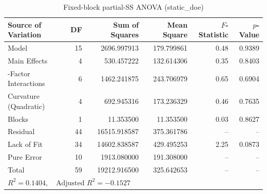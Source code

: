\begin{table}[htbp]
\centering
\caption{Fixed-block partial-SS ANOVA (static_doe)}
\label{tab:anova_0_static_doe_latency_us}
\begin{tabular}{lrrrrr}
\hline
\textbf{Source of Variation} & \textbf{DF} & \textbf{Sum of Squares} & \textbf{Mean Square} & \textbf{$F$-Statistic} & \textbf{$p$-Value} \\
\hline
Model & 15 & 2696.997913 & 179.799861 & 0.48 & 0.9389 \\
\quad Main Effects & 4 & 530.457222 & 132.614306 & 0.35 & 0.8403 \\
\quad 2-Factor Interactions & 6 & 1462.241875 & 243.706979 & 0.65 & 0.6904 \\
\quad Curvature (Quadratic) & 4 & 692.945316 & 173.236329 & 0.46 & 0.7635 \\
\quad Blocks & 1 & 11.353500 & 11.353500 & 0.03 & 0.8627 \\
Residual & 44 & 16515.918587 & 375.361786 & -- & -- \\
\quad Lack of Fit & 34 & 14602.838587 & 429.495253 & 2.25 & 0.0873 \\
\quad Pure Error & 10 & 1913.080000 & 191.308000 & -- & -- \\
Total & 59 & 19212.916500 & 325.642653 & -- & -- \\
\hline
\multicolumn{6}{l}{\small $R^2 = 0.1404, \quad \text{Adjusted } R^2 = -0.1527$} \\
\hline
\end{tabular}
\end{table}